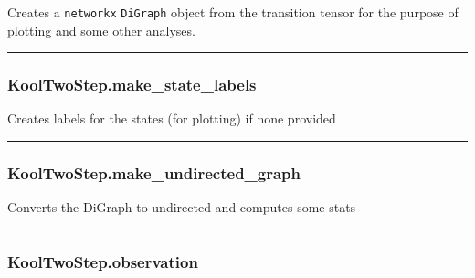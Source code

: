Creates a \texttt{networkx} \texttt{DiGraph} object from the transition
tensor for the purpose of plotting and some other analyses.

\begin{center}\rule{0.5\linewidth}{\linethickness}\end{center}

\subsubsection{KoolTwoStep.make\_state\_labels}\label{kooltwostep.make_state_labels}

\begin{Shaded}
\begin{Highlighting}[]
\NormalTok{)}
\end{Highlighting}
\end{Shaded}

Creates labels for the states (for plotting) if none provided

\begin{center}\rule{0.5\linewidth}{\linethickness}\end{center}

\subsubsection{KoolTwoStep.make\_undirected\_graph}\label{kooltwostep.make_undirected_graph}

\begin{Shaded}
\begin{Highlighting}[]
\NormalTok{)}
\end{Highlighting}
\end{Shaded}

Converts the DiGraph to undirected and computes some stats

\begin{center}\rule{0.5\linewidth}{\linethickness}\end{center}

\subsubsection{KoolTwoStep.observation}\label{kooltwostep.observation}

\begin{Shaded}
\begin{Highlighting}[]
\NormalTok{)}
\end{Highlighting}
\end{Shaded}

